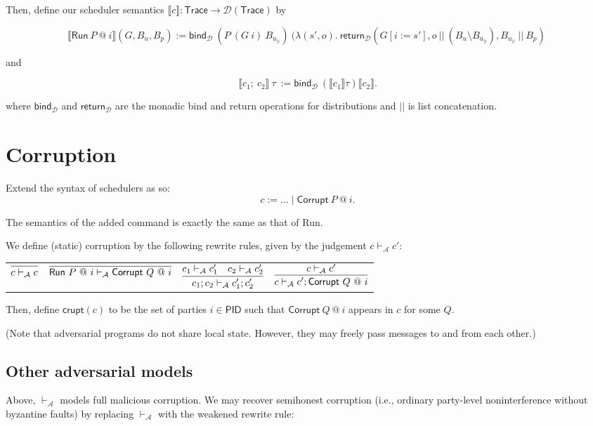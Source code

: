 \documentclass{article}
\newcommand{\PID}{\mathsf{PID}}
\newcommand{\D}{\mathcal{D}}
\begin{document}
Then, define our scheduler semantics $\llbracket c \rrbracket : \textsf{Trace} \to \D(\textsf{Trace})$ by

\[\llbracket \textsf{Run}\ P\ @\ i \rrbracket (G, B_u, B_p) := \textsf{bind}_{\D}\ (P\ (G\ i)\ B_{u_{| i}})\ (\lambda (s', o).\ \textsf{return}_{\D} (G[i := s'], o\ ||\ (B_u \setminus B_{u_{| i}}), B_{u_{| i}}\ ||\ B_p)\ \]

and

\[\llbracket c_1;\ c_2 \rrbracket\ \tau\ := \textsf{bind}_{\D}\ (\llbracket c_1 \rrbracket \tau) \llbracket c_2 \rrbracket.\]

where $\textsf{bind}_{\D}$ and $\textsf{return}_{\D}$ are the monadic bind and return operations for distributions and $||$ is list concatenation.

\section{Corruption}

Extend the syntax of schedulers as so:
\[ c := \dots \mid \textsf{Corrupt}\ P\ @\ i.\]

The semantics of the added command is exactly the same as that of \textsf{Run}.

We define (static) corruption by the following rewrite rules, given by the judgement $c \vdash_{\mathcal{A}} c'$:

\begin{tabular}{cccc}
    $\infer{c \vdash_{\mathcal{A}} c}{}$ & 
    $\infer{\textsf{Run}\ P\ @\ i \vdash_{\mathcal{A}} \textsf{Corrupt}\ Q\ @\ i}{}$ &
    $\infer{c_1;c_2 \vdash_{\mathcal{A}} c_1'; c_2'} {c_1 \vdash_\mathcal{A} c_1' & c_2 \vdash_\mathcal{A} c_2'}$ &
    $\infer{c \vdash_{\mathcal{A}} c'; \textsf{Corrupt}\ Q\ @\ i}{c \vdash_\mathcal{A} c'}$ \\
\end{tabular}

Then, define $\mathsf{crupt}(c)$ to be the set of parties $i \in \PID$ such that $\textsf{Corrupt}\ Q\ @\ i$ appears in $c$ for some $Q$.

(Note that adversarial programs do not share local state. However, they may freely pass messages to and from each other.)

\subsection{Other adversarial models}

Above, $\vdash_\mathcal{A}$ models full malicious corruption. We may recover semihonest corruption (i.e., ordinary party-level noninterference without byzantine faults) by replacing $\vdash_\mathcal{A}$ with the weakened rewrite rule:
\end{document}
